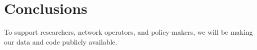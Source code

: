 
\section{Conclusions}

To support researchers, network operators, and policy-makers, we will be making our data and code publicly available.
